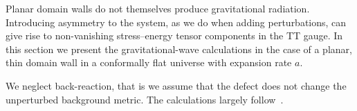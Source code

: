 



\newcommand{\ah}{\ALIASah}          %
\newcommand{\Src}{f}                %
\newcommand{\polplus}{\ALIASpolplus}
\newcommand{\polcross}{\ALIASpolcross}
 






Planar domain walls do not themselves produce gravitational radiation. Introducing asymmetry to the system, as we do when adding perturbations, can give rise to non-vanishing stress--energy tensor components in the TT gauge. %
In this section we present the gravitational-wave calculations in the case of a planar, thin domain wall in a conformally flat universe with expansion rate $a$.


We neglect back-reaction, that is we assume that the defect does not change the unperturbed background metric. The calculations largely follow~\citet{kawasakiStudyGravitationalRadiation2011}.









